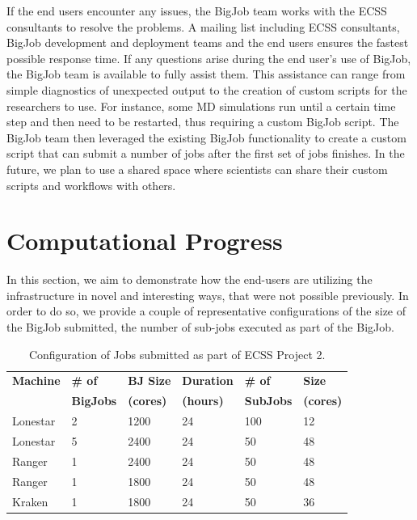 \documentclass{sig-alternate}
\begin{document}
If the end users encounter any issues, the BigJob team works with the ECSS
consultants to resolve the problems. A mailing list including ECSS consultants,
BigJob development and deployment teams and the end users ensures the fastest
possible response time. If any questions arise during the end user's use of
BigJob, the BigJob team is available to fully assist them. This assistance can
range from simple diagnostics of unexpected output to  the creation of
custom scripts for the researchers to use. For instance, some MD simulations
run until a certain time step and then need to be restarted, thus requiring a
custom BigJob script. The BigJob team then leveraged the existing BigJob
functionality to create a custom script that can submit a number of jobs after
the first set of jobs finishes. In the future, we plan to use a shared space
where scientists can share their custom scripts and workflows with others.

\section{Computational Progress}

In this section, we aim to demonstrate how the end-users are utilizing
the infrastructure in novel and interesting ways, that were not
possible previously. In order to do so, we provide a couple of
representative configurations of the size of the BigJob submitted, the
number of sub-jobs executed as part of the BigJob.


\begin{table}[h]
\begin{center}
\begin{tabular}{p{1.1cm}p{1.2cm}p{1.2cm}p{1.2cm}p{1.1cm}p{0.8cm}}
\toprule
\textbf{Machine}  & 
\textbf{\# of}    &
\textbf{BJ Size} & 
\textbf{Duration} & 
\textbf{\# of}    &
\textbf{Size}     \\
                 &
\textbf{BigJobs} &
\textbf{(cores)} &
\textbf{(hours)} &
\textbf{SubJobs} &
\textbf{(cores)} 
                  \\ \midrule
Lonestar & 2 & 1200 & 24 & 100 & 12 \\ \midrule
Lonestar & 5 & 2400 & 24 &  50 & 48 \\ \midrule
Ranger   & 1 & 2400 & 24 &  50 & 48 \\ \midrule
Ranger   & 1 & 1800 & 24 &  50 & 48 \\ \midrule
Kraken   & 1 & 1800 & 24 &  50 & 36 \\ \bottomrule
\end{tabular}
\caption{Configuration of Jobs submitted as part of ECSS Project
  2.}
\label{table:results1}
\end{center}
\end{table}
\end{document}

